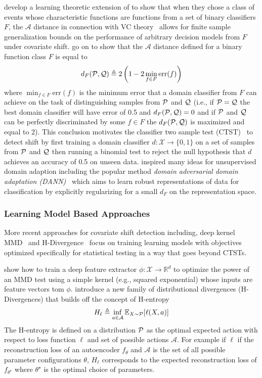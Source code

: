 \citeauthor{domainrep} develop a learning theoretic extension of \citeauthor{atheory} to show that when they chose a class of events whose characteristic
functions are functions from a set of binary classifiers $F$, the $\mathcal{A}$ distance in connection with VC theory~\citep{vapnik95}
allows for finite sample generalization bounds on the performance of arbitrary decision models from $F$ under covariate shift.
\citeauthor{domainrep} go on to show that the $\mathcal{A}$ distance defined for a binary function class $F$ is equal to
\begin{equation}
    d_F(\mathcal{P}, \mathcal{Q}) \triangleq 2\left(1-2 \min_{f\in F}\text{err}(f)\right)\label{eq:a-dist}
\end{equation}
where $\min_{f\in F}\text{err}(f)$ is the minimum error that a domain classifier from $F$ can achieve on the task of distinguishing samples from $\mathcal{P}$ and $\mathcal{Q}$
(i.e., if $\mathcal{P}=\mathcal{Q}$ the best domain classifier will have error of 0.5 and $d_F(\mathcal{P}, \mathcal{Q})=0$ and if $\mathcal{P}$ and $\mathcal{Q}$ can be perfectly discriminated by some $f\in F$ the $d_F(\mathcal{P}, \mathcal{Q})$ is maximized and equal to $2$).
This conclusion motivates the classifier two sample test (CTST)~\citep{paz2017revisiting} to detect shift by first training a domain classifier $d: \mathcal{X}\to \{0,1\}$ on a set of samples from $\mathcal{P}$ and $\mathcal{Q}$ then
running a binomial test to reject the null hypothesis that $d$ achieves an accuracy of 0.5 on unseen data.
\citeauthor{domainrep} inspired many ideas for unsupervised domain adaption including the popular method \textit{domain adversarial domain adaptation (DANN)}~\citep{ganin2016domain}
which aims to learn robust representations of data for classification by explicitly regularizing for a small $d_F$ on the representation space.

\subsubsection*{Learning Model Based Approaches}
More recent approaches for covariate shift detection including, deep kernel MMD~\citep{liu2020learning} and H-Divergence~\citep{zhao2022comparing} focus on training learning models with objectives optimized specifically for statistical testing in a way that goes beyond CTSTs.

\citeauthor{liu2020learning} show how to train a deep feature extractor $\phi: \mathcal{X}\to\mathbb{R}^d$ to
optimize the power of an MMD test using a simple kernel (e.g., squared exponential) whose inputs are feature vectors tom $\phi$.
\citeauthor{zhao2022comparing} introduce a new family of distributional divergences (H-Divergences) that builds off the concept of H-entropy~\citep{10.1214/aoms/1177704567}
\[H_\ell \triangleq \inf_{a\in \mathcal{A}}\mathbb{E}_{X\sim\mathcal{P}}[\ell(X, a)]\]
The H-entropy is defined on a distribution $\mathcal{P}$ as the optimal expected action with respect to loss function $\ell$ and set of possible actions $\mathcal{A}$.
For example if $\ell$ if the reconstruction loss of an autoencoder $f_\theta$ and $\mathcal{A}$ is the set of all possible parameter configurations $\theta$, $H_\ell$ corresponds to the expected reconstruction
loss of $f_{\theta^\star}$ where $\theta^\star$ is the optimal choice of parameters.

